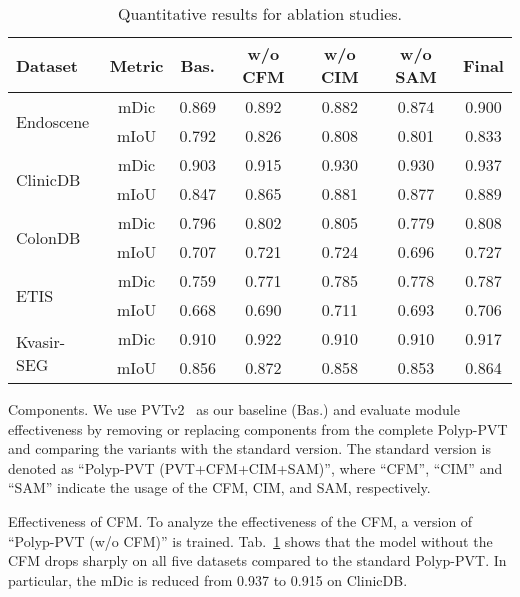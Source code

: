 \documentclass[journal]{IEEEtran}
\newcommand{\tabref}[1]{Tab.~\ref{#1}}
\begin{document}
\begin{table}
  \centering
  \small
	\caption{Quantitative results for ablation studies.}\label{tab:abalation study}
	\setlength\tabcolsep{1.4pt}
	\renewcommand{\arraystretch}{1.0}
    \begin{tabular}{lc|c|c|c|c|c}
    \hline
    Dataset & Metric & Bas.     & w/o CFM     & w/o CIM      & w/o SAM & Final\\
    \hline
    \multirow{2}[0]{*}{Endoscene} & mDic  & 0.869 & 0.892 & 0.882 & 0.874 & {0.900} \\
          & mIoU  & 0.792 & {0.826} & 0.808 & 0.801 & {0.833} \\
  \hline
    \multirow{2}[0]{*}{ClinicDB} & mDic  & 0.903 & 0.915 & 0.930 & 0.930 & {0.937} \\
          & mIoU  & 0.847 & 0.865 & 0.881& 0.877 & {0.889} \\
\hline
    \multirow{2}[0]{*}{ColonDB} & mDic  & 0.796  & 0.802 & 0.805 & 0.779 & {0.808} \\
          & mIoU  & 0.707   & 0.721 & 0.724 & 0.696 & {0.727} \\
  \hline
    \multirow{2}[0]{*}{ETIS} & mDic  & 0.759 & 0.771 & 0.785 & 0.778 & {0.787} \\
          & mIoU  & 0.668 & 0.690 & {0.711} & 0.693 & {0.706} \\
  \hline
    \multirow{2}[0]{*}{Kvasir-SEG} & mDic  & 0.910 & 0.922 & 0.910 & 0.910 & 0.917 \\
          & mIoU  & 0.856 & 0.872 & 0.858 & 0.853 & {0.864} \\
      \hline
    \end{tabular}
\end{table}





\textcolor[RGB]{31,100,212}{Components.} 
We use PVTv2~\cite{wang2021pvtv2} as our baseline (Bas.) and evaluate module effectiveness by removing or replacing components from the complete Polyp-PVT and comparing the variants with the standard version. 
The standard version is denoted as ``Polyp-PVT (PVT+CFM+CIM+SAM)'', where ``CFM'', ``CIM'' and ``SAM'' indicate the usage of the CFM, CIM, and SAM, respectively.

\textcolor[RGB]{31,100,212}{Effectiveness of CFM.} To analyze the effectiveness of the CFM, a version of ``Polyp-PVT (w/o CFM)'' is trained. 
\tabref{tab:abalation study} shows that the model without the CFM drops sharply on all five datasets compared to the standard Polyp-PVT.
In particular, the mDic is reduced from 0.937 to 0.915 on ClinicDB. 
\end{document}
